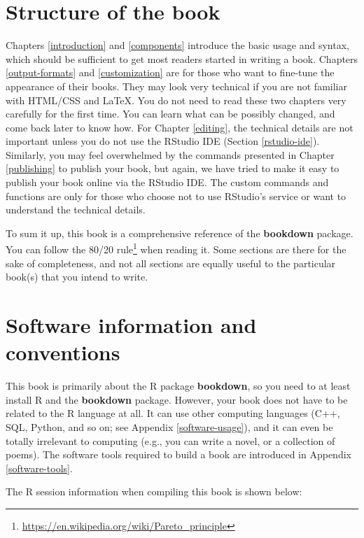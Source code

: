 \documentclass[
  12pt,
]{krantz}
\renewcommand{\href}[2]{#2\footnote{\url{#1}}}
\theoremstyle{definition}
\theoremstyle{definition}
\theoremstyle{definition}
\theoremstyle{definition}
\theoremstyle{remark}
\begin{document}
\section*{Structure of the book}\label{structure-of-the-book}


Chapters \ref{introduction} and \ref{components} introduce the basic usage and syntax, which should be sufficient to get most readers started in writing a book. Chapters \ref{output-formats} and \ref{customization} are for those who want to fine-tune the appearance of their books. They may look very technical if you are not familiar with HTML/CSS and LaTeX. You do not need to read these two chapters very carefully for the first time. You can learn what can be possibly changed, and come back later to know how. For Chapter \ref{editing}, the technical details are not important unless you do not use the RStudio IDE (Section \ref{rstudio-ide}). Similarly, you may feel overwhelmed by the commands presented in Chapter \ref{publishing} to publish your book, but again, we have tried to make it easy to publish your book online via the RStudio IDE. The custom commands and functions are only for those who choose not to use RStudio's service or want to understand the technical details.

To sum it up, this book is a comprehensive reference of the \textbf{bookdown} package. You can follow the \href{https://en.wikipedia.org/wiki/Pareto_principle}{80/20 rule} when reading it. Some sections are there for the sake of completeness, and not all sections are equally useful to the particular book(s) that you intend to write.

\section*{Software information and conventions}\label{software-information-and-conventions}


This book is primarily about the R package \textbf{bookdown}, so you need to at least install R and the \textbf{bookdown} package. However, your book does not have to be related to the R language at all. It can use other computing languages (C++, SQL, Python, and so on; see Appendix \ref{software-usage}), and it can even be totally irrelevant to computing (e.g., you can write a novel, or a collection of poems). The software tools required to build a book are introduced in Appendix \ref{software-tools}.

The R session information when compiling this book is shown below:
\end{document}
